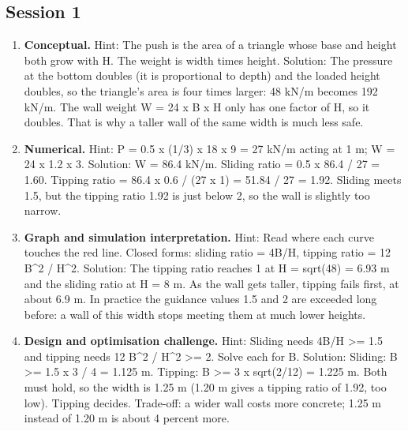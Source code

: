 \documentclass[11pt,a4paper]{article}
\begin{document}
\subsection*{Session 1}
\begin{enumerate}[nosep]
\item \textbf{Conceptual.} Hint: The push is the area of a triangle whose base and height both grow with H. The weight is width times height. Solution: The pressure at the bottom doubles (it is proportional to depth) and the loaded height doubles, so the triangle's area is four times larger: 48 kN/m becomes 192 kN/m. The wall weight W = 24 x B x H only has one factor of H, so it doubles. That is why a taller wall of the same width is much less safe.
\item \textbf{Numerical.} Hint: P = 0.5 x (1/3) x 18 x 9 = 27 kN/m acting at 1 m; W = 24 x 1.2 x 3. Solution: W = 86.4 kN/m. Sliding ratio = 0.5 x 86.4 / 27 = 1.60. Tipping ratio = 86.4 x 0.6 / (27 x 1) = 51.84 / 27 = 1.92. Sliding meets 1.5, but the tipping ratio 1.92 is just below 2, so the wall is slightly too narrow.
\item \textbf{Graph and simulation interpretation.} Hint: Read where each curve touches the red line. Closed forms: sliding ratio = 4B/H, tipping ratio = 12 B\textasciicircum{}2 / H\textasciicircum{}2. Solution: The tipping ratio reaches 1 at H = sqrt(48) = 6.93 m and the sliding ratio at H = 8 m. As the wall gets taller, tipping fails first, at about 6.9 m. In practice the guidance values 1.5 and 2 are exceeded long before: a wall of this width stops meeting them at much lower heights.
\item \textbf{Design and optimisation challenge.} Hint: Sliding needs 4B/H \textgreater{}= 1.5 and tipping needs 12 B\textasciicircum{}2 / H\textasciicircum{}2 \textgreater{}= 2. Solve each for B. Solution: Sliding: B \textgreater{}= 1.5 x 3 / 4 = 1.125 m. Tipping: B \textgreater{}= 3 x sqrt(2/12) = 1.225 m. Both must hold, so the width is 1.25 m (1.20 m gives a tipping ratio of 1.92, too low). Tipping decides. Trade-off: a wider wall costs more concrete; 1.25 m instead of 1.20 m is about 4 percent more.
\end{enumerate}
\end{document}
